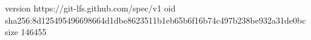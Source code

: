 version https://git-lfs.github.com/spec/v1
oid sha256:8d125495496698664d1dbe8623511b1eb65b6f16b74c497b238be932a31de0bc
size 146455
